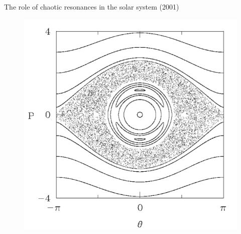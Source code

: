 \documentclass{beamer}
\begin{document}
\begin{frame}{The role of chaotic resonances in the solar system (2001)}
\begin{figure}[h]
\begin{minipage}[h]{0.7\linewidth}
\includegraphics[width=1\linewidth]{./01_1.png}
\end{minipage}
\end{figure}
\end{frame}
\end{document}
